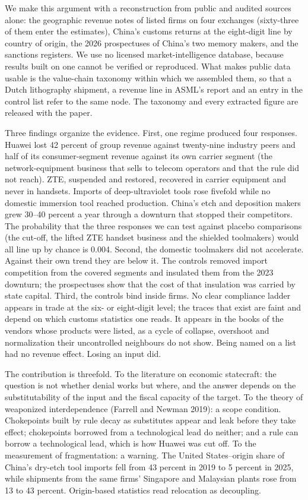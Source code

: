 \documentclass[12pt]{article}
\begin{document}
We make this argument with a reconstruction from public and audited sources alone: the geographic revenue notes of listed firms on four exchanges (sixty-three of them enter the estimates), China's customs returns at the eight-digit line by country of origin, the 2026 prospectuses of China's two memory makers, and the sanctions registers. We use no licensed market-intelligence database, because results built on one cannot be verified or reproduced. What makes public data usable is the value-chain taxonomy within which we assembled them, so that a Dutch lithography shipment, a revenue line in ASML's report and an entry in the control list refer to the same node. The taxonomy and every extracted figure are released with the paper.

Three findings organize the evidence. First, one regime produced four responses. Huawei lost 42 percent of group revenue against twenty-nine industry peers and half of its consumer-segment revenue against its own carrier segment (the network-equipment business that sells to telecom operators and that the rule did not reach). ZTE, suspended and restored, recovered in carrier equipment and never in handsets. Imports of deep-ultraviolet tools rose fivefold while no domestic immersion tool reached production. China's etch and deposition makers grew 30--40 percent a year through a downturn that stopped their competitors. The probability that the three responses we can test against placebo comparisons (the cut-off, the lifted ZTE handset business and the shielded toolmakers) would all line up by chance is 0.004. Second, the domestic toolmakers did not accelerate. Against their own trend they are below it. The controls removed import competition from the covered segments and insulated them from the 2023 downturn; the prospectuses show that the cost of that insulation was carried by state capital. Third, the controls bind inside firms. No clear compliance ladder appears in trade at the six- or eight-digit level; the traces that exist are faint and depend on which customs statistics one reads. It appears in the books of the vendors whose products were listed, as a cycle of collapse, overshoot and normalization their uncontrolled neighbours do not show. Being named on a list had no revenue effect. Losing an input did.

The contribution is threefold. To the literature on economic statecraft: the question is not whether denial works but where, and the answer depends on the substitutability of the input and the fiscal capacity of the target. To the theory of weaponized interdependence (Farrell and Newman 2019): a scope condition. Chokepoints built by rule decay as substitutes appear and leak before they take effect; chokepoints borrowed from a technological lead do neither; and a rule can borrow a technological lead, which is how Huawei was cut off. To the measurement of fragmentation: a warning. The United States--origin share of China's dry-etch tool imports fell from 43 percent in 2019 to 5 percent in 2025, while shipments from the same firms' Singapore and Malaysian plants rose from 13 to 43 percent. Origin-based statistics read relocation as decoupling.
\end{document}
